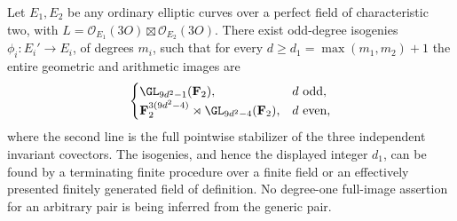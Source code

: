 \begin{theorem}
\label{thm:ordinary-products-eventual-full}
Let $E_1,E_2$ be any ordinary elliptic curves over a perfect
field of characteristic two, with
$L=\mathcal O_{E_1}(3O)\boxtimes\mathcal O_{E_2}(3O)$.
There exist odd-degree isogenies
$\phi_i:E_i'\to E_i$, of degrees $m_i$, such that for every
$d\ge d_1=\max(m_1,m_2)+1$ the entire geometric and arithmetic
images are
\[
 \begin{cases}
 \GL_{9d^2-1}(\mathbf F_2),&d\text{ odd},\\
 \mathbf F_2^{3(9d^2-4)}\rtimes\GL_{9d^2-4}(\mathbf F_2),
       &d\text{ even},
 \end{cases}
\]
where the second line is the full pointwise stabilizer of the
three independent invariant covectors.
The isogenies, and hence the displayed integer $d_1$, can be
found by a terminating finite procedure over a finite field or
an effectively presented finitely generated field of definition.
No degree-one full-image assertion for an arbitrary pair is
being inferred from the generic pair.
\end{theorem}


